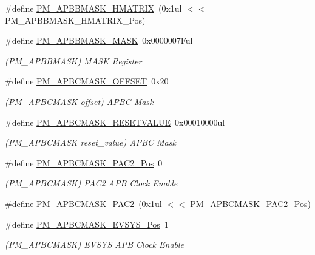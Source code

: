 \begin{DoxyCompactItemize}
\#define \mbox{\hyperlink{group___s_a_m_d21___p_m_gaa62bb31ada2daa9a4f36e66fea506320}{P\+M\+\_\+\+A\+P\+B\+B\+M\+A\+S\+K\+\_\+\+H\+M\+A\+T\+R\+IX}}~(0x1ul $<$$<$ P\+M\+\_\+\+A\+P\+B\+B\+M\+A\+S\+K\+\_\+\+H\+M\+A\+T\+R\+I\+X\+\_\+\+Pos)
\item 
\#define \mbox{\hyperlink{group___s_a_m_d21___p_m_gab0290a0b91d23c9c3108b1a721ecef45}{P\+M\+\_\+\+A\+P\+B\+B\+M\+A\+S\+K\+\_\+\+M\+A\+SK}}~0x0000007\+Ful
\begin{DoxyCompactList}\small\item\em (P\+M\+\_\+\+A\+P\+B\+B\+M\+A\+SK) M\+A\+SK Register \end{DoxyCompactList}\item 
\#define \mbox{\hyperlink{group___s_a_m_d21___p_m_gaf3fe940d686f2bf61e04fc17f001fe8e}{P\+M\+\_\+\+A\+P\+B\+C\+M\+A\+S\+K\+\_\+\+O\+F\+F\+S\+ET}}~0x20
\begin{DoxyCompactList}\small\item\em (P\+M\+\_\+\+A\+P\+B\+C\+M\+A\+SK offset) A\+P\+BC Mask \end{DoxyCompactList}\item 
\#define \mbox{\hyperlink{group___s_a_m_d21___p_m_gae162e84836c8699cf3308f894f9d44c7}{P\+M\+\_\+\+A\+P\+B\+C\+M\+A\+S\+K\+\_\+\+R\+E\+S\+E\+T\+V\+A\+L\+UE}}~0x00010000ul
\begin{DoxyCompactList}\small\item\em (P\+M\+\_\+\+A\+P\+B\+C\+M\+A\+SK reset\+\_\+value) A\+P\+BC Mask \end{DoxyCompactList}\item 
\#define \mbox{\hyperlink{group___s_a_m_d21___p_m_ga4454b03d2866981fd10575fa0e0c6591}{P\+M\+\_\+\+A\+P\+B\+C\+M\+A\+S\+K\+\_\+\+P\+A\+C2\+\_\+\+Pos}}~0
\begin{DoxyCompactList}\small\item\em (P\+M\+\_\+\+A\+P\+B\+C\+M\+A\+SK) P\+A\+C2 A\+PB Clock Enable \end{DoxyCompactList}\item 
\#define \mbox{\hyperlink{group___s_a_m_d21___p_m_ga08b03d53fcc375970c00a1b34323f6d8}{P\+M\+\_\+\+A\+P\+B\+C\+M\+A\+S\+K\+\_\+\+P\+A\+C2}}~(0x1ul $<$$<$ P\+M\+\_\+\+A\+P\+B\+C\+M\+A\+S\+K\+\_\+\+P\+A\+C2\+\_\+\+Pos)
\item 
\#define \mbox{\hyperlink{group___s_a_m_d21___p_m_ga388a30acb0bfb91367b2b129c311d2ce}{P\+M\+\_\+\+A\+P\+B\+C\+M\+A\+S\+K\+\_\+\+E\+V\+S\+Y\+S\+\_\+\+Pos}}~1
\begin{DoxyCompactList}\small\item\em (P\+M\+\_\+\+A\+P\+B\+C\+M\+A\+SK) E\+V\+S\+YS A\+PB Clock Enable \end{DoxyCompactList}\item 

\end{DoxyCompactItemize}
